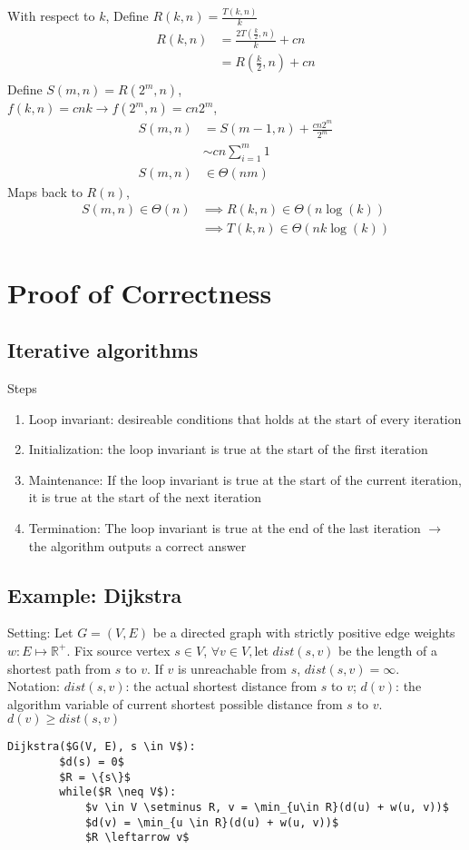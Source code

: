 \documentclass{article}
\begin{document}
With respect to $k$, Define $R(k, n) = \frac{T(k, n)}{k}$
\begin{align*}
    R(k, n) &= \frac{2 T(\frac{k}{2}, n)}{k} + cn\\
    &= R(\frac{k}{2}, n) + cn\\
\end{align*}
Define $S(m, n) = R(2^m, n)$,\\
$f(k, n) = cnk \rightarrow f(2^m, n) = cn2^m$, 
\begin{align*}
    S(m, n) &= S(m - 1, n) + \frac{cn2^m}{2^m}\\
    & \sim cn\sum_{i=1}^{m} 1\\
    S(m, n) &\in \Theta(nm)
\end{align*}
Maps back to $R(n)$,
\begin{align*}
    S(m, n) \in \Theta(n) &\implies R(k, n) \in \Theta(n\log(k))\\
    &\implies T(k, n) \in \Theta(nk\log(k))
\end{align*}




\section{Proof of Correctness}
\subsection*{Iterative algorithms}
Steps
\begin{enumerate}
    \item Loop invariant: desireable conditions that holds at the start of every iteration
    \item Initialization: the loop invariant is true at the start of the first iteration
    \item Maintenance: If the loop invariant is true at the start of the current iteration, it is true at the start of the next iteration
    \item Termination: The loop invariant is true at the end of the last iteration $\rightarrow$ the algorithm outputs a correct answer
\end{enumerate}
\subsection*{Example: Dijkstra}
Setting: Let $G = (V, E)$ be a directed graph with strictly positive edge weights $w : E \mapsto \mathbb{R}^+.$ Fix source vertex $s \in V$, 
$\forall v \in V, $let $dist(s, v)$ be the length of a shortest path from $s$ to $v$. If $v$ is unreachable from $s$, $dist(s,v) = \infty$.\\
Notation: $dist(s, v)$: the actual shortest distance from $s$ to $v$; $d(v)$: the algorithm variable of current shortest possible distance from $s$ to $v$. $d(v) \geq dist(s, v)$
\begin{lstlisting}[mathescape=true]
    Dijkstra($G(V, E), s \in V$):
        $d(s) = 0$
        $R = \{s\}$
        while($R \neq V$):
            $v \in V \setminus R, v = \min_{u\in R}(d(u) + w(u, v))$
            $d(v) = \min_{u \in R}(d(u) + w(u, v))$
            $R \leftarrow v$
\end{lstlisting}
\end{document}
